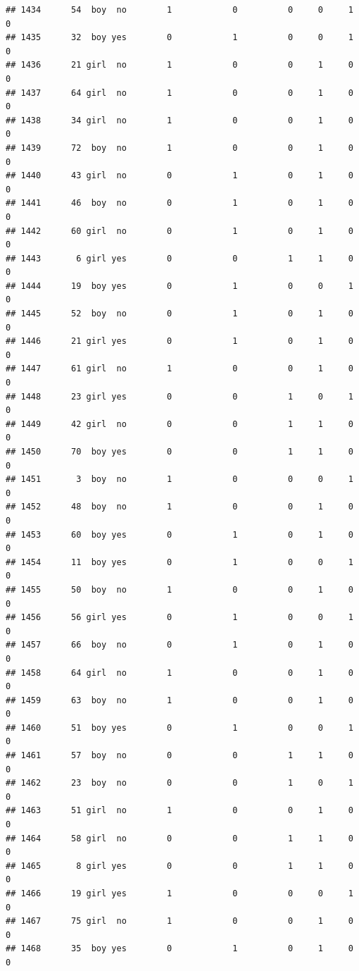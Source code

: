 \documentclass[man]{apa6}
\begin{document}
\begin{verbatim}
## 1434      54  boy  no        1            0          0     0     1     0
## 1435      32  boy yes        0            1          0     0     1     0
## 1436      21 girl  no        1            0          0     1     0     0
## 1437      64 girl  no        1            0          0     1     0     0
## 1438      34 girl  no        1            0          0     1     0     0
## 1439      72  boy  no        1            0          0     1     0     0
## 1440      43 girl  no        0            1          0     1     0     0
## 1441      46  boy  no        0            1          0     1     0     0
## 1442      60 girl  no        0            1          0     1     0     0
## 1443       6 girl yes        0            0          1     1     0     0
## 1444      19  boy yes        0            1          0     0     1     0
## 1445      52  boy  no        0            1          0     1     0     0
## 1446      21 girl yes        0            1          0     1     0     0
## 1447      61 girl  no        1            0          0     1     0     0
## 1448      23 girl yes        0            0          1     0     1     0
## 1449      42 girl  no        0            0          1     1     0     0
## 1450      70  boy yes        0            0          1     1     0     0
## 1451       3  boy  no        1            0          0     0     1     0
## 1452      48  boy  no        1            0          0     1     0     0
## 1453      60  boy yes        0            1          0     1     0     0
## 1454      11  boy yes        0            1          0     0     1     0
## 1455      50  boy  no        1            0          0     1     0     0
## 1456      56 girl yes        0            1          0     0     1     0
## 1457      66  boy  no        0            1          0     1     0     0
## 1458      64 girl  no        1            0          0     1     0     0
## 1459      63  boy  no        1            0          0     1     0     0
## 1460      51  boy yes        0            1          0     0     1     0
## 1461      57  boy  no        0            0          1     1     0     0
## 1462      23  boy  no        0            0          1     0     1     0
## 1463      51 girl  no        1            0          0     1     0     0
## 1464      58 girl  no        0            0          1     1     0     0
## 1465       8 girl yes        0            0          1     1     0     0
## 1466      19 girl yes        1            0          0     0     1     0
## 1467      75 girl  no        1            0          0     1     0     0
## 1468      35  boy yes        0            1          0     1     0     0

\end{verbatim}
\end{document}
